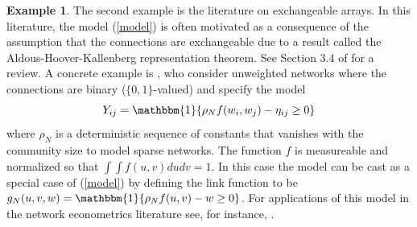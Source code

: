 \documentclass[12pt]{article}
\theoremstyle{definition}
\newtheorem{example}{Example}
\begin{document}
\begin{example}
The second example is the literature on exchangeable arrays. In this literature, the model (\ref{model}) is often motivated as a consequence of the assumption that the connections are exchangeable due to a result called the Aldous-Hoover-Kallenberg representation theorem. See Section 3.4 of \cite{graham2020network} for a review. A concrete example is \cite{bickel2009nonparametric}, who consider unweighted networks where the connections are binary ($\{0,1\}$-valued) and specify the model 
\begin{equation*}
Y_{ij} = \mathbbm{1}\{\rho_{N}f(w_i,w_j) - \eta_{ij} \geq 0\}
\end{equation*}
where $\rho_N$ is a deterministic sequence of constants that vanishes with the community size to model  sparse networks. The function $f$ is measureable and normalized so that $\int\int f(u,v)dudv = 1$. In this case the model can be cast as a special case of (\ref{model}) by defining the link function to be $g_{N}(u,v,w) = \mathbbm{1}\{\rho_Nf(u,v) - w \geq 0\}$. For applications of this model in the network econometrics literature see, for instance, \cite{menzel2017bootstrap,zeleneev2020identification,auerbach2022identification}. 
\end{example}
\end{document}
